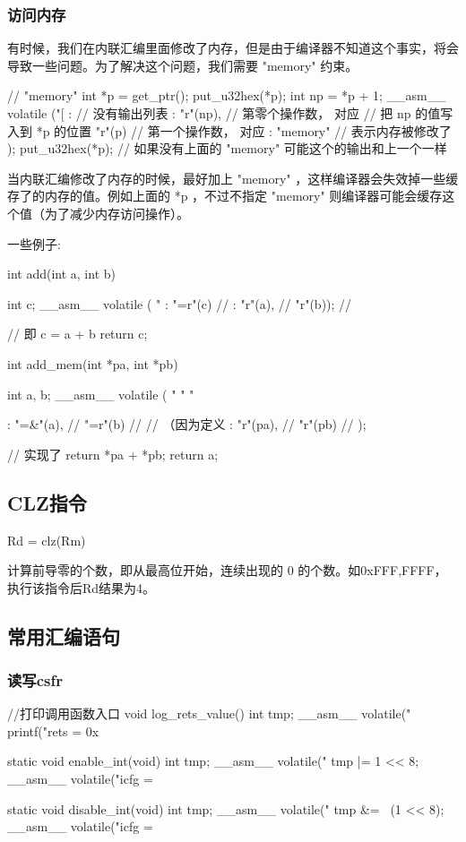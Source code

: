 \subsubsection{访问内存}
有时候，我们在内联汇编里面修改了内存，但是由于编译器不知道这个事实，将会导致一些问题。为了解决这个问题，我们需要 "memory" 约束。
\begin{myccode}
// "memory"
int *p = get_ptr();
put_u32hex(*p);
int np = *p + 1;
__asm__ volatile ("[%
: // 没有输出列表
: "r"(np), // 第零个操作数， 对应 %
// 把 np 的值写入到 *p 的位置
"r"(p) // 第一个操作数， 对应 %
 : "memory" // 表示内存被修改了
 );
 put_u32hex(*p); // 如果没有上面的 "memory" 可能这个的输出和上一个一样
\end{myccode}

当内联汇编修改了内存的时候，最好加上 "memory" ，这样编译器会失效掉一些缓存了的内存的值。例如上面的 *p ，不过不指定 "memory" 则编译器可能会缓存这个值（为了减少内存访问操作）。

一些例子:
\begin{myccode}
int add(int a, int b)
{
    int c;
    __asm__ volatile (
    "%
    : "=r"(c) // %
    : "r"(a), // %
    "r"(b)); // %

     // 即 c = a + b
     return c;
}

int add_mem(int *pa, int *pb)
{
    int a, b;
    __asm__ volatile (
    "%
    "%
    "%

    :
    "=&"(a), // %
    "=r"(b) // %
    // （因为定义 %
    : "r"(pa), // %
    "r"(pb) // %
);

// 实现了 return *pa + *pb;
return a;
}
\end{myccode}

\subsection{CLZ指令}
\begin{myccode}
    Rd = clz(Rm)
\end{myccode}
计算前导零的个数，即从最高位开始，连续出现的 0 的个数。如0xFFF,FFFF，执行该指令后Rd结果为4。

\subsection{常用汇编语句}
\subsubsection{读写csfr}
\begin{myccode}
 //打印调用函数入口
 void log_rets_value()
{
    int tmp;
    __asm__ volatile("%
    printf("rets = 0x%
}

static void enable_int(void)
{
    int tmp;
    __asm__ volatile("%
    tmp |= 1 << 8;
    __asm__ volatile("icfg = %
}

static void disable_int(void)
{
    int tmp;
    __asm__ volatile("%
    tmp &= ~(1 << 8);
    __asm__ volatile("icfg = %
}
\end{myccode}
